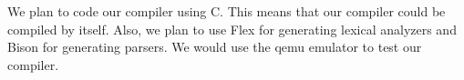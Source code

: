 We plan to code our compiler using C. This means that our compiler 
could be compiled by itself. Also, we plan to use Flex for generating 
lexical analyzers and Bison for generating parsers. We would use the qemu\cite{Qemu}
emulator to test our compiler.